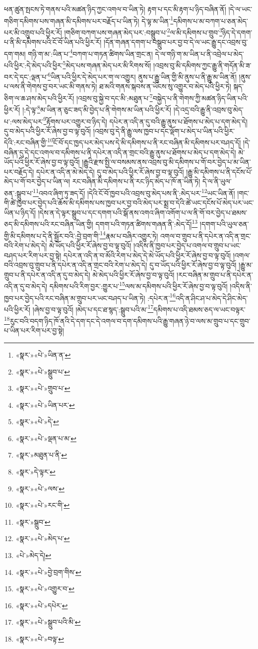 ཕན་ཚུན་སྤངས་ཏེ་གནས་པའི་མཚན་ཉིད་ཀྱང་འགལ་བ་ཡིན་ཏེ། རྟག་པ་དང་མི་རྟག་པ་ཉིད་བཞིན་ནོ། །དེ་ལ་ཡང་གཅིག་དམིགས་པས་གཞན་མི་དམིགས་པར་བརྗོད་པ་ཡིན་ཏེ། དེ་ལྟ་མ་ཡིན་\footnote{«སྣར་»«པེ་»ཡིན་ན་}དམིགས་པ་མ་བཀག་པ་ཅན་མེད་པར་མི་འགྲུབ་པའི་ཕྱིར་རོ། །གཅིག་བཀག་པས་གཞན་མེད་པར་:བསྒྲུབ་པ་\footnote{«སྣར་»«པེ་»སྒྲུབ་པ་}ལ་མི་དམིགས་པ་གྲུབ་\footnote{«སྣར་»«པེ་»གྲུབ་པ་}ཉིད་དེ་དགག་པ་ནི་མི་དམིགས་པའི་ངོ་བོ་ཡིན་པའི་ཕྱིར་རོ། །དོན་གཞན་དགག་པ་བསྒྲུབ་པར་བྱ་བ་དེ་ལ་ཡང་རྒྱུ་དང་འབྲས་བུ་དག་གམ། གཉི་ག་མ་:ཡིན་པ་\footnote{«སྣར་»«པེ་»ཡིན་པར་}བཀག་པ་གཏན་ཚིགས་ཡིན་གྲང་ན། དེ་ལ་གཉི་ག་མ་ཡིན་པ་ནི་འབྲེལ་པ་མེད་པའི་ཕྱིར་:དེ་མེད་པའི་ཕྱིར་\footnote{«སྣར་»«པེ་»དེ་}མེད་པས་གཞན་མེད་པར་མི་རིགས་སོ། །འབྲས་བུ་མི་དམིགས་ཀྱང་རྒྱུ་ནི་གདོན་མི་ཟ་བར་དེ་དང་:ལྡན་པ་\footnote{«སྣར་»«པེ་»ལྡན་པ་མ་}ཡིན་པའི་ཕྱིར་དེ་མེད་པར་ག་ལ་འགྱུར། ནུས་པ་རྒྱུ་ཡིན་གྱི་མི་ནུས་པ་ནི་རྒྱུ་མ་ཡིན་ནོ། །ནུས་པ་ལས་ནི་གེགས་བྱ་བར་ཡང་མི་གནས་ཏེ། ཐ་མའི་གནས་སྐབས་ན་ཡོངས་སུ་འགྱུར་བ་མེད་པའི་ཕྱིར་ཏེ། སྐད་ཅིག་ལ་ཆ་ཤས་མེད་པའི་ཕྱིར་རོ། །འབྲས་བུ་སྐྱེ་བ་དང་མི་:མཐུན་པ་\footnote{«སྣར་»མཐུན་པ་ནི་}བསྐྱེད་པ་ནི་གེགས་ཀྱི་མཚན་ཉིད་ཡིན་པའི་ཕྱིར་རོ། །:དེ་ལྟ་\footnote{«སྣར་»དེ་ལྟར་}མ་ཡིན་ན་ཅུང་ཟད་མི་བྱེད་པ་ནི་གེགས་མ་ཡིན་པའི་ཕྱིར་རོ། །དེ་འདྲ་བའི་རྒྱུ་ནི་འབྲས་བུ་མེད་པ་:ལས་མེད་པར་\footnote{«སྣར་»«པེ་»ལས་}རྟོགས་པར་འགྱུར་བ་ཉིད་དེ། དཔེར་ན་འདི་ན་དུ་བའི་རྒྱུ་ནུས་པ་ཐོགས་པ་མེད་པ་དག་མེད་དེ། དུ་བ་མེད་པའི་ཕྱིར་རོ་ཞེས་བྱ་བ་ལྟ་བུའོ། །འབྲས་བུ་དེ་ནི་རྒྱུ་ལས་ཁྱབ་པ་དང་ལྡོག་པ་མེད་པ་ཡིན་པའི་ཕྱིར་དེའི་:རང་བཞིན་གྱི་\footnote{«སྣར་»«པེ་»རང་གི་}ངོ་བོ་དང་ཁྱད་པར་མེད་པས་དེ་མི་དམིགས་པ་ནི་རང་བཞིན་མི་དམིགས་པར་བཤད་དོ། །དེ་བཞིན་དུ་དེ་དང་འགལ་བ་དམིགས་པ་ནི་དཔེར་ན་འདི་ན་གྲང་བའི་རྒྱུ་ནུས་པ་ཐོགས་པ་མེད་པ་དག་མེད་དེ། མེ་ཡོད་པའི་ཕྱིར་རོ་ཞེས་བྱ་བ་ལྟ་བུའོ། །རྒྱུའི་རྫས་སྤྱི་ལ་བསམས་ནས་འབྲས་བུ་མི་དམིགས་པ་གོ་བར་བྱེད་པ་མ་ཡིན་པར་བརྗོད་དེ། དཔེར་ན་འདི་ན་མེ་མེད་དེ། དུ་བ་མེད་པའི་ཕྱིར་རོ་ཞེས་བྱ་བ་ལྟ་བུའོ། །རྒྱུ་མི་དམིགས་པ་ནི་དངོས་པོ་མེད་པ་གོ་བར་བྱེད་པ་ཡིན་ལ། རང་བཞིན་མི་དམིགས་པ་ནི་རང་ཉིད་མེད་པ་ཁོ་ན་ཡིན་ཏེ། དེ་ལ་ནི་ཡུལ་ཅན་:སྒྲུབ་པ་\footnote{«སྣར་»སྒྲུབ་}འབའ་ཞིག་ཏུ་ཟད་དོ། །དེའི་ངོ་བོ་ཁྱབ་པའི་འབྲས་བུ་མེད་པས་ནི་:མེད་པར་\footnote{«སྣར་»«པེ་»མེད་པ་}ཡང་ཡིན་ནོ། །གང་གི་ཚེ་ཁྱབ་པར་བྱེད་པའི་ཆོས་མི་དམིགས་པས་ཁྱབ་པར་བྱ་བའི་མེད་པར་སྨྲ་བ་དེའི་ཚེ་ཡང་དངོས་པོ་མེད་པར་ཡང་ཡིན་པ་ཉིད་དོ། །དེས་ན་དེ་ལྟར་སྒྲུབ་པ་དང་དགག་པའི་སྒོ་ནས་འགའ་ཞིག་འགོག་པ་ལ་ནི་གོ་བར་བྱེད་པ་ཐམས་ཅད་མི་དམིགས་པའི་རང་བཞིན་ཡིན་གྱི། དགག་པའི་གཏན་ཚིགས་གཞན་ནི་:མེད་དོ།\footnote{«པེ་»མེད་དེ།} །དགག་པའི་ཡུལ་ཅན་གྱི་མི་དམིགས་པ་དེ་ནི་སྦྱོར་བའི་:བྱེ་བྲག་གི་\footnote{«སྣར་»«པེ་»བྱེ་བྲག་གིས་}རྣམ་པ་བཞིར་འགྱུར་ཏེ། འགལ་བ་གྲུབ་པ་ནི་དཔེར་ན་འདི་ན་གྲང་བའི་རེག་པ་མེད་དེ། མེ་ཡོད་པའི་ཕྱིར་རོ་ཞེས་བྱ་བ་ལྟ་བུའོ། །འདིས་ནི་ཁྱབ་པར་བྱེད་པ་འགལ་བ་གྲུབ་པ་ཡང་བཤད་པར་རིག་པར་བྱ་སྟེ། དཔེར་ན་འདི་ན་བ་མོའི་རེག་པ་མེད་དེ་མེ་ཡོད་པའི་ཕྱིར་རོ་ཞེས་བྱ་བ་ལྟ་བུའོ། །འགལ་བའི་འབྲས་བུ་གྲུབ་པ་ནི་དཔེར་ན་འདི་ན་གྲང་བའི་རེག་པ་མེད་དེ། དུ་བ་ཡོད་པའི་ཕྱིར་རོ་ཞེས་བྱ་བ་ལྟ་བུའོ། །རྒྱུ་མ་གྲུབ་པ་ནི་དཔེར་ན་འདི་ན་དུ་བ་མེད་དེ། མེ་མེད་པའི་ཕྱིར་རོ་ཞེས་བྱ་བ་ལྟ་བུའོ། །རང་བཞིན་མ་གྲུབ་པ་ནི་དཔེར་ན་འདི་ན་དུ་བ་མེད་དེ། དམིགས་པའི་རིག་བྱར་:གྱུར་པ་\footnote{«སྣར་»«པེ་»འགྱུར་བ་}ལས་མ་དམིགས་པའི་ཕྱིར་རོ་ཞེས་བྱ་བ་ལྟ་བུའོ། །འདིས་ནི་ཁྱབ་པར་བྱེད་པའི་རང་བཞིན་མ་གྲུབ་པར་ཡང་བཤད་པ་ཡིན་ཏེ། :དཔེར་ན་\footnote{«སྣར་»«པེ་»དཔེར་}འདི་ན་ཤིང་ཤ་པ་མེད་དེ་ཤིང་མེད་པའི་ཕྱིར་རོ། །ཞེས་བྱ་བ་ལྟ་བུའོ། །མེད་པ་དང་ཐ་སྙད་:སྒྲུབ་པའི་མ་\footnote{«སྣར་»«པེ་»སྒྲུབ་པའི་མི་}དམིགས་པ་འདི་ཐམས་ཅད་ལ་ཡང་བལྟར་\footnote{«སྣར་»«པེ་»བལྟ་}རུང་བའི་བདག་ཉིད་ཁོ་ནའི་དེ་དག་དང་དེ་འགལ་བ་དག་དམིགས་པའི་རྒྱུ་གཞན་ཉེ་བ་ལས་མ་གྲུབ་པ་དང་གྲུབ་པ་ཡིན་པར་རིག་པར་བྱ་སྟེ། 